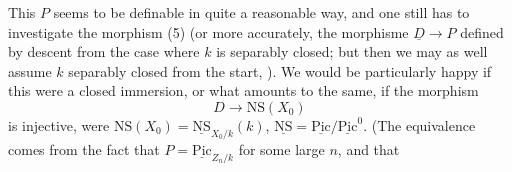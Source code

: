 \documentclass[11pt,a4paper]{article}
\begin{document}
This $P$ seems to be definable in quite a reasonable way, and one still has to
investigate the morphism (5) (or more accurately, the morphisme
$\underline{D} \to P$ defined by descent from the case where $k$ is separably
closed; but then we may as well assume $k$ separably closed from the start,
). We would be particularly happy if this were a closed
immersion, or what amounts to the same, if the morphism
\begin{equation*}
\tag{12} D \longrightarrow \mathrm{NS}(X_0)
\end{equation*}
is injective, were
$\mathrm{NS}(X_0) = \underline{\mathrm{NS}}_{X_0/k}(k)$,
$\underline{\mathrm{NS}} = \underline{\mathrm{Pic}} / \underline{\mathrm{Pic}}^0$.
(The equivalence comes from the fact that
$P = \underline{\mathrm{Pic}}_{Z_n/k}$ for some large $n$, and that
\end{document}
